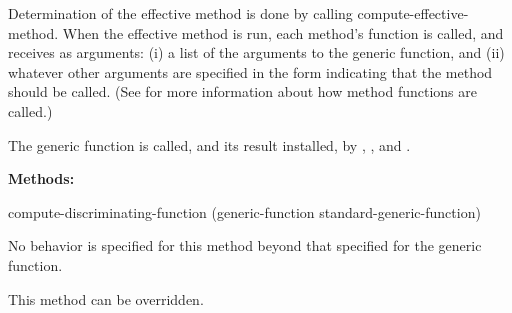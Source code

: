 \begin{defun}
Determination of the effective method is done by calling
compute-effective-method. When the effective method is run, each method's
function is called, and receives as arguments: (i) a list of the arguments to
the generic function, and (ii) whatever other arguments are specified in the
 form indicating that the method should be called. (See
 for more information about how method functions are
called.)

The generic function  is called, and its
result installed, by , ,
 and .

\textbf{Methods:}

\begin{defun}
compute-discriminating-function (generic-function standard-generic-function)

No behavior is specified for this method beyond that specified for the generic function.

This method can be overridden.
\end{defun}
\end{defun}

